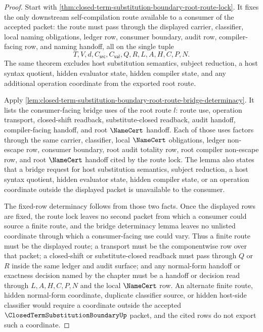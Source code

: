 \begin{proof}
Start with \autoref{thm:closed-term-substitution-boundary-root-route-lock}. It fixes the only downstream self-compilation route available to a consumer of the accepted packet: the route must pass through the displayed carrier, classifier, local naming obligations, ledger row, consumer boundary, audit row, compiler-facing row, and naming handoff, all on the single tuple
$$
T,V,d,C_{\mathsf{src}},C_{\mathsf{val}},Q,R,L,A,H,C,P,N.
$$
The same theorem excludes host substitution semantics, subject reduction, a host syntax quotient, hidden evaluator state, hidden compiler state, and any additional operation coordinate from the exported root route.

Apply \autoref{lem:closed-term-substitution-boundary-root-route-bridge-determinacy}. It lists the consumer-facing bridge uses of the root route $l$: route use, operation transport, closed-shift readback, substitute-closed readback, audit handoff, compiler-facing handoff, and root $\NameCert$ handoff. Each of those uses factors through the same carrier, classifier, local $\NameCert$ obligations, ledger non-escape row, consumer boundary, root audit totality row, root compiler non-escape row, and root $\NameCert$ handoff cited by the route lock. The lemma also states that a bridge request for host substitution semantics, subject reduction, a host syntax quotient, hidden evaluator state, hidden compiler state, or an operation coordinate outside the displayed packet is unavailable to the consumer.

The fixed-row determinacy follows from those two facts. Once the displayed rows are fixed, the route lock leaves no second packet from which a consumer could source a finite route, and the bridge determinacy lemma leaves no unlisted coordinate through which a consumer-facing use could vary. Thus a finite route must be the displayed route; a transport must be the componentwise row over that packet; a closed-shift or substitute-closed readback must pass through $Q$ or $R$ inside the same ledger and audit surface; and any normal-form handoff or exactness decision named by the chapter must be a handoff or decision read through $L,A,H,C,P,N$ and the local $\NameCert$ row. An alternate finite route, hidden normal-form coordinate, duplicate classifier source, or hidden host-side classifier would require a coordinate outside the accepted $\ClosedTermSubstitutionBoundaryUp$ packet, and the cited rows do not export such a coordinate.
\end{proof}
